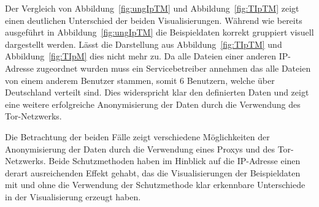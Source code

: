\documentclass[
    fontsize=12pt,
    headings=small,
    parskip=half,           %
    bibliography=totoc,
    numbers=noenddot,       %
    open=any,               %
    ]{scrreprt}
\begin{document}
Der Vergleich von Abbildung~\ref{fig:ungIpTM} und Abbildung~\ref{fig:TIpTM} zeigt einen deutlichen Unterschied der beiden Visualisierungen.
Während wie bereits ausgeführt in Abbildung~\ref{fig:ungIpTM} die Beispieldaten korrekt gruppiert visuell dargestellt werden. 
Lässt die Darstellung aus Abbildung~\ref{fig:TIpTM} und Abbildung~\ref{fig:TIpM} dies nicht mehr zu.
Da alle Dateien einer anderen IP-Adresse zugeordnet wurden muss ein Servicebetreiber annehmen das alle Dateien von einem anderem Benutzer stammen, somit 6 Benutzern, welche über Deutschland verteilt sind. 
Dies widerspricht klar den definierten Daten und zeigt eine weitere erfolgreiche Anonymisierung der Daten durch die Verwendung des Tor-Netzwerks.

Die Betrachtung der beiden Fälle zeigt verschiedene Möglichkeiten der Anonymisierung der Daten durch die Verwendung eines Proxys und des Tor-Netzwerks.
Beide Schutzmethoden haben im Hinblick auf die IP-Adresse einen derart ausreichenden Effekt gehabt, das die Visualisierungen der Beispieldaten mit und ohne die Verwendung der Schutzmethode klar erkennbare Unterschiede in der Visualisierung erzeugt haben.
%

%
\end{document}
